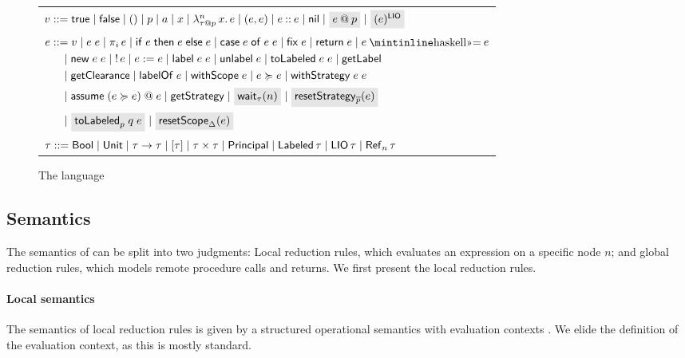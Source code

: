 \begin{figure*}
    \centering
    \begin{tabular}{l}
         $\val ::= \true \mid \false \mid () \mid p \mid \addr \mid x \mid \abs{n}{\lb{p}{\type}}{x}{\expr} \mid (\expr, \expr) \mid \cons{\expr}{\expr} \mid \nil \mid \graybox{\lb{p}{\expr}} \mid \graybox{\lio{\expr}}$ \\
         $\begin{aligned}[t]
         \expr &::= \val \mid \app{\expr}{\expr} \mid \proj{i}{\expr} \mid \ifexpr{\expr}{\expr}{\expr} \mid \case{\expr}{\expr}{\expr} \mid \fix{\expr} \mid \return{\expr} \mid \bind{\expr}{\expr} \\ &\quad \mid
         \new{\expr}{\expr} \mid \readref{\expr} \mid \writeref{\expr}{\expr} \mid \Label{\expr}{\expr} \mid \unlabel{\expr} \mid
         \tolabeled{\expr}{\expr} \mid \getlabel \\ &\quad \mid \getclearance \mid \labelof{\expr} \mid \withscope{\expr} \mid \expr \actsfor \expr \mid \withstrategy{\expr}{\expr} \\ &\quad \mid \adddelegate{\expr}{\expr}{\expr} \mid \getstrategy \mid \graybox{\wait{n}[\type]} \mid \graybox{\resetstrategy{\overline{p}}{\expr}} \\ &\quad \mid \graybox{\resetTolabeled{p}{q}{\expr}} \mid \graybox{\resetscope{\scope}{\expr}}
         \end{aligned}$ \\
         $\type ::= \bool \mid \unit \mid \func{\type}{\type} \mid \listtype{\type} \mid \pair{\type}{\type} \mid \labeltype \mid \labeled{\type} \mid \liotype{\type} \mid \reftype[n]{\type}$ \\
    \end{tabular}
    \caption{The \lang{} language}
    \label{fig:language-syntax}
\end{figure*}

\subsection{Semantics}
The semantics of \lang{} can be split into two judgments: Local reduction rules, which evaluates an expression on a specific node $n$; and global reduction rules, which models remote procedure calls and returns. We first present the local reduction rules.

\paragraph{Local semantics}
The semantics of local reduction rules is given by a structured operational semantics with evaluation contexts \cite{Felleisen:1988:TPF:73560.73576}. We elide the definition of the evaluation context, as this is mostly standard.

